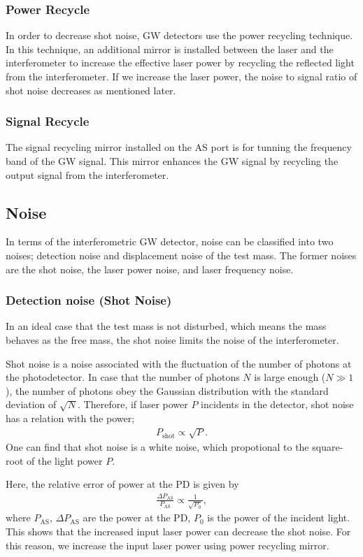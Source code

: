 \subsubsection{Power Recycle}
In order to decrease shot noise, GW detectors use the power recycling technique. In this technique, an additional mirror is installed between the laser and the interferometer to increase the effective laser power by recycling the reflected light from the interferometer. If we increase the laser power, the noise to signal ratio of shot noise decreases as mentioned later.

\subsubsection{Signal Recycle}
The signal recycling mirror installed on the AS port is for tunning the frequency band of the GW signal. This mirror enhances the GW signal by recycling the output signal from the interferometer.

\subsection{Noise}
In terms of the interferometric GW detector, noise can be classified into two noises; detection noise and displacement noise of the test mass. The former noises are the shot noise, the laser power noise, and laser frequency noise.


\subsubsection{Detection noise (Shot Noise)}
In an ideal case that the test mass is not disturbed, which means the mass behaves as the free mass, the shot noise limits the noise of the interferometer.

Shot noise is a noise associated with the fluctuation of the number of photons at the photodetector. In case that the number of photons $N$ is large enough ($N\gg1$), the number of photons obey the Gaussian distribution with the standard deviation of $\sqrt{N}$. Therefore, if laser power $P$ incidents in the detector, shot noise has a relation with the power;
\begin{eqnarray}
  P_{\mathrm{shot}} \propto \sqrt{P}.  \label{eq:eq136}
\end{eqnarray}
One can find that shot noise is a white noise, which propotional to the square-root of the light power $P$.

Here, the relative error of power at the PD is given by 
\begin{eqnarray}
  \frac{\Delta P_{\mathrm{AS}}}{P_{\mathrm{AS}}}  \propto \frac{1}{\sqrt{P_{\mathrm{0}}}},  \label{eq:eq136}
\end{eqnarray}
where $P_{\mathrm{AS}},\,\Delta P_{\mathrm{AS}}$ are the power at the PD, $P_0$ is the power of the incident light. This shows that the increased input laser power can decrease the shot noise. For this reason, we increase the input laser power using power recycling mirror.

